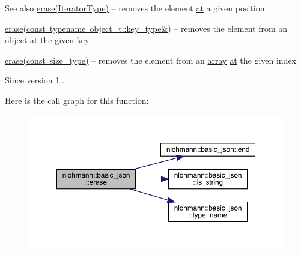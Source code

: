 \begin{DoxySeeAlso}{See also}
\mbox{\hyperlink{classnlohmann_1_1basic__json_a068a16e76be178e83da6a192916923ed}{erase(\+Iterator\+Type)}} -- removes the element \mbox{\hyperlink{classnlohmann_1_1basic__json_a73ae333487310e3302135189ce8ff5d8}{at}} a given position 

\mbox{\hyperlink{classnlohmann_1_1basic__json_a2f8484d69c55d8f2a9697a7bec29362a}{erase(const typename object\+\_\+t\+::key\+\_\+type\&)}} -- removes the element from an \mbox{\hyperlink{classnlohmann_1_1basic__json_a9f42ee7d10eee2d5a73fd94ca7f767ca}{object}} \mbox{\hyperlink{classnlohmann_1_1basic__json_a73ae333487310e3302135189ce8ff5d8}{at}} the given key 

\mbox{\hyperlink{classnlohmann_1_1basic__json_a88cbcefe9a3f4d294bed0653550a5cb9}{erase(const size\+\_\+type)}} -- removes the element from an \mbox{\hyperlink{classnlohmann_1_1basic__json_a4a4ec75e4d2845d9bcf7a9e5458e4949}{array}} \mbox{\hyperlink{classnlohmann_1_1basic__json_a73ae333487310e3302135189ce8ff5d8}{at}} the given index
\end{DoxySeeAlso}
\begin{DoxySince}{Since}
version 1.. 
\end{DoxySince}
Here is the call graph for this function\+:\nopagebreak
\begin{figure}[H]
\begin{center}
\leavevmode
\includegraphics[width=350pt]{classnlohmann_1_1basic__json_a4b3f7eb2d4625d95a51fbbdceb7c5f39_cgraph}
\end{center}
\end{figure}
\mbox{\label{classnlohmann_1_1basic__json_a2f8484d69c55d8f2a9697a7bec29362a}} 
